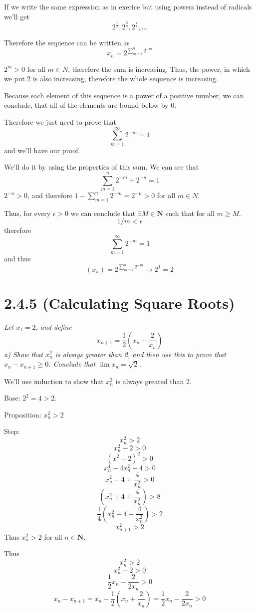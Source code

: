 \documentclass[11pt,oneside,titlepage]{article}
\begin{document}
If we write the same expression as in exerice but using powers instead of
radicals we'll get
$$ 2^{\frac{1}{2}}, 2^{\frac{3}{4}}, 2^{\frac{7}{8}}, ...$$ 

Therefore the sequence can be written as
$$x_n =  2 ^{\sum_{m = 1}^n 2^{-m}}$$

$2^m > 0$ for all $m \in N$, therefore the sum is increasing. Thus, the power, in
which we put 2 is also increasing, therefore the whole sequence is increasing.

Because each element of this sequence is a power of a positive number, we can
conclude, that all of the elements are bound below by 0.

Therefore we just need to prove that 
$$\sum_{m = 1}^{\infty} 2^{-m} = 1$$
and we'll have our proof.

We'll do it by using the properties of this sum. We can see that
$$\sum_{m = 1}^{n}2^{-m} + 2^{-n} = 1$$
$2^{-n} > 0$, and therefore $1 - \sum_{m = 1}^{n}2^{-m} = 2^{-n} > 0$ for
all $m \in N$.

Thus, for every $\epsilon > 0$ we can conclude that $\exists M \in \textbf{N}$ such
that for all $m \geq M$.
$$1/m < \epsilon$$
therefore
$$\sum_{m = 1}^{\infty} 2^{-m} = 1$$
and thus
$$(x_n) =  2 ^{\sum_{m = 1}^n 2^{-m}} \to 2^1 = 2$$

\section*{2.4.5 (Calculating Square Roots)}
\textit{Let $x_1 = 2$, and define }
$$x_{n+1} = \frac{1}{2}(x_n + \frac{2}{x_n})$$
\textit{a) Show that $x_n^2$ is always greater than 2, and then use this to prove
  that $x_n - x_{n + 1} \geq 0$. Conclude that $\lim x_n = \sqrt{2}$.  }

We'll use induction to show that $x_n^2$ is always greated than 2.

Base: $2 ^2 = 4 > 2$.

Proposition: $x_n ^ 2 > 2$

Step:
$$x_n^2 > 2$$
$$x_n^2 - 2 > 0$$
$$(x^2 - 2)^2 > 0$$
$$x_n ^ 4 - 4 x_n^2 + 4 > 0$$
$$x_n ^ 2 - 4 + \frac{4}{x_n^2} > 0$$
$$(x_n ^ 2 + 4 + \frac{4}{x_n^2}) > 8$$
$$\frac{1}{4}(x_n ^ 2 + 4 + \frac{4}{x_n^2}) > 2$$
$$x_{n + 1}^2 > 2$$
Thus $x_n^2 > 2$ for all $n \in \textbf{N}$.

Thus
$$x_n^2  > 2$$
$$x_n^2 - 2 > 0$$
$$\frac{1}{2}x_n - \frac{2}{2 x_n} > 0$$
$$x_n - x_{n + 1} = x_n - \frac{1}{2}(x_n + \frac{2}{x_n}) = \frac{1}{2}x_n - \frac{2}{2x_n} > 0$$
\end{document}
